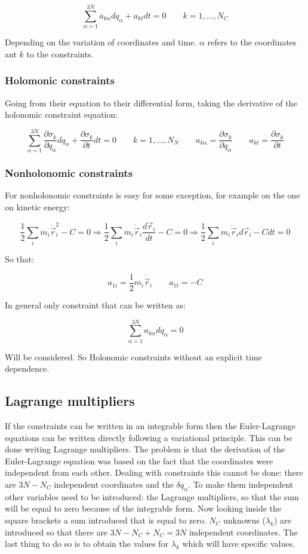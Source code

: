 	$$\sum\limits_{\alpha = 1}^{3N} a_{k\alpha}dq_\alpha + a_{kt}dt = 0\qquad k = 1, \dots, N_C$$

	Depending on the variation of coordinates and time.
	$\alpha$ refers to the coordinates ant $k$ to the constraints.

		\subsubsection{Holomonic constraints}
		Going from their equation to their differential form, taking the derivative of the holonomic constraint equation:

		$$\sum\limits_{\alpha=1}^{3N}\frac{\partial\sigma_k}{\partial q_\alpha}dq_\alpha + \frac{\partial\sigma_k}{\partial t} dt = 0\qquad k = 1, \dots, N_N\qquad a_{k\alpha} = \frac{\partial\sigma_k}{\partial q_\alpha}\qquad a _{kt} = \frac{\partial\sigma_k}{\partial t}$$

		\subsubsection{Nonholonomic constraints}
		For nonholonomic constraints is easy for some exception, for example on the one on kinetic energy:

		$$\frac{1}{2}\sum\limits_i m_i\dot{\vec{r}}_i^2 - C = 0\Rightarrow\frac{1}{2}\sum\limits_i m_i\dot{\vec{r}}_i\frac{d\vec{r}_i}{dt} - C = 0\Rightarrow\frac{1}{2}\sum\limits_i m_i\dot{\vec{r}}_id\vec{r}_i-Cdt = 0$$

		So that:

		$$a_{1i}=\frac{1}{2}m_i\dot{\vec{r}}_i\qquad a_{1t} = -C$$

		In general only constraint that can be written as:

		$$\sum\limits_{\alpha=1}^{3N}a_{k\alpha}dq_\alpha=0$$

		Will be considered.
		So Holonomic constraints without an explicit time dependence.

	\subsection{Lagrange multipliers}
	If the constraints can be written in an integrable form then the Euler-Lagrange equations can be written directly following a variational principle.
	This can be done writing Lagrange multipliers.
	The problem is that the derivation of the Euler-Lagrange equation was based on the fact that the coordinates were independent from each other.
	Dealing with constraints this cannot be done: there are $3N-N_C$ independent coordinates and the $\delta q_\alpha$.
	To make them independent other variables need to be introduced: the Lagrange multipliers, so that the sum will be equal to zero because of the integrable form.
	Now looking inside the square brackets a sum introduced that is equal to zero.
	$N_C$ unknowns ($\lambda_k$) are introduced so that there are $3N-N_C+N_C=3N$ independent coordinates.
	The last thing to do so is to obtain the values for $\lambda_k$ which will have specific values.

